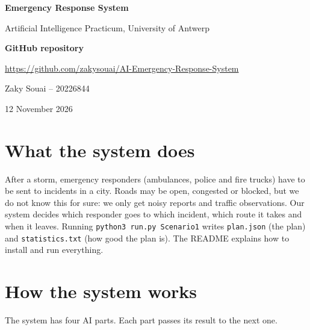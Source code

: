\documentclass[11pt,a4paper]{article}
\newcommand{\repo}{\url{https://github.com/zakysouai/AI-Emergency-Response-System}}
\begin{document}
\begin{titlepage}
  \centering
  \vspace*{4cm}
  {\LARGE\bfseries Emergency Response System\par}
  \vspace{0.4cm}
  {\large Artificial Intelligence Practicum, University of Antwerp\par}
  \vspace{2cm}
  {\large\bfseries GitHub repository\par}
  \vspace{0.2cm}
  {\large \repo\par}
  \vspace{2cm}
  {\large Zaky Souai -- 20226844\par}
  \vspace{0.3cm}
  {\large 12 November 2026\par}
  \vfill
\end{titlepage}

\section{What the system does}

After a storm, emergency responders (ambulances, police and fire trucks) have to
be sent to incidents in a city. Roads may be open, congested or blocked, but we
do not know this for sure: we only get noisy reports and traffic observations.
Our system decides which responder goes to which incident, which route it takes
and when it leaves. Running \texttt{python3 run.py Scenario1} writes
\texttt{plan.json} (the plan) and \texttt{statistics.txt} (how good the plan is).
The README explains how to install and run everything.

\section{How the system works}

The system has four AI parts. Each part passes its result to the next one.
\end{document}
